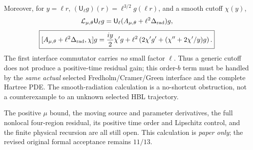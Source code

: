 Moreover, for \(y=\ell r\), \((\mathsf U_\ell g)(r)=
\ell^{3/2}g(\ell r)\), and a smooth cutoff \(\chi(y)\),
\[
 \mathcal L_{\mu,\theta}\mathsf U_\ell g
 =\mathsf U_\ell(A_{\mu,\theta}+\ell^2\Delta_{\rm rad})g,
\]
\[
 \boxed{
 [A_{\mu,\theta}+\ell^2\Delta_{\rm rad},\chi]g
 =\frac{iy}{2}\chi'g+
 \ell^2\left(2\chi'g'+(\chi''+2\chi'/y)g\right).
 }
\]
The first interface commutator carries \emph{no} small factor
\(\ell\). Thus a generic cutoff does not produce a positive-time
residual gain; this order-\(b\) term must be handled by the
\emph{same actual} selected Fredholm/Cramer/Green interface and the
complete Hartree PDE. The smooth-radiation calculation is a
no-shortcut obstruction, not a counterexample to an unknown selected
HBL trajectory.

The positive \(\mu\) bound, the moving source and parameter
derivatives, the full nonlocal four-region residual, its positive
time order and Lipschitz control, and the finite physical recursion
are all still open. This calculation is \emph{paper only};
the revised original formal acceptance remains \(11/13\).
